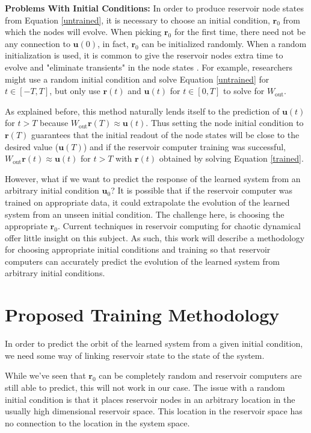\documentclass[journal]{journal}
\begin{document}
\textbf{Problems With Initial Conditions:} In order to produce reservoir node states from Equation \ref{untrained}, it is necessary to choose an initial condition, $\mathbf{r}_0$ from which the nodes will evolve. When picking $\mathbf{r}_0$ for the first time, there need not be any connection to $\mathbf{u}(0)$, in fact, $\mathbf{r}_0$ can be initialized randomly. When a random initialization is used, it is common to give the reservoir nodes extra time to evolve and "eliminate transients" in the node states \cite{Ott2018}. For example, researchers might use a random initial condition and solve Equation \ref{untrained} for $t \in [-T, T]$, but only use $\mathbf{r}(t)$ and $\mathbf{u}(t)$ for $t \in [0, T]$ to solve for $W_\text{out}$. 

As explained before, this method naturally lends itself to the prediction of $\mathbf{u}(t)$ for $t > T$ because $W_\text{out} \mathbf{r}(T) \approx \mathbf{u}(t)$. Thus setting the node initial condition to $\mathbf{r}(T)$ guarantees that the initial readout of the node states will be close to the desired value ($\mathbf{u}(T)$) and if the reservoir computer training was successful, $W_\text{out} \mathbf{r}(t) \approx \mathbf{u}(t)$ for $t > T$ with $\mathbf{r}(t)$ obtained by solving Equation \ref{trained}.

However, what if we want to predict the response of the learned system from an arbitrary initial condition $\mathbf{u}_0$? It is possible that if the reservoir computer was trained on appropriate data, it could extrapolate the evolution of the learned system from an unseen initial condition. The challenge here, is choosing the appropriate $\mathbf{r}_0$. Current techniques in reservoir computing for chaotic dynamical offer little insight on this subject. As such, this work will describe a methodology for choosing appropriate initial conditions and training so that reservoir computers can accurately predict the evolution of the learned system from arbitrary initial conditions.

\section{Proposed Training Methodology}

In order to predict the orbit of the learned system from a given initial condition, we need some way of linking reservoir state to the state of the system. 

While we've seen that $\mathbf{r}_0$ can be completely random and reservoir computers are still able to predict, this will not work in our case. The issue with a random initial condition is that it places reservoir nodes in an arbitrary location in the usually high dimensional reservoir space. This location in the reservoir space has no connection to the location in the system space.
\end{document}
